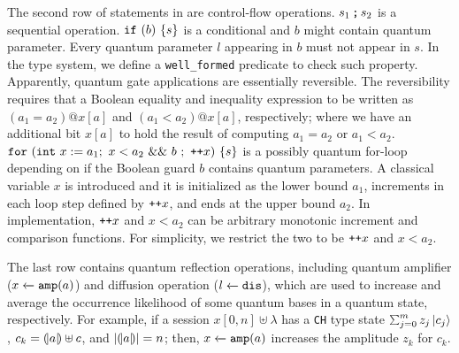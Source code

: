 The second row of statements in  are control-flow operations.
${s_1}\,\texttt{;}\,{s_2}$ is a sequential operation.
$\texttt{if}~{(b)}~{\{s\}}$ is a conditional and $b$ might contain quantum parameter.
Every quantum parameter $l$ appearing in $b$ must not appear in $s$.
In the \qafny type system, we define a \texttt{well\_formed} predicate to check such property.
Apparently, quantum gate applications are essentially reversible. The reversibility requires that a Boolean equality and inequality expression to be written as $(a_1 = a_2) @ x[a]$ and $(a_1 < a_2) @ x[a]$, respectively; where we have an additional bit $x[a]$ to hold the result of computing $a_1=a_2$ or $a_1<a_2$.
$\texttt{for}~{(\texttt{int}~{x}:={a_1};~x<a_2~\&\&~b~;~\texttt{++}x)}~{\{s\}}$ is a possibly quantum for-loop depending on if the Boolean guard $b$ contains quantum parameters.
A classical variable $x$ is introduced and it is initialized as the lower bound $a_1$, increments in each loop step defined by $\texttt{++}x$, and ends at the upper bound $a_2$.
In \qafny implementation, $\texttt{++}x$ and $x<a_2$ can be arbitrary monotonic increment and comparison functions.
For simplicity, we restrict the two to be $\texttt{++}x$ and $x<a_2$.

The last row contains quantum reflection operations, including quantum amplifier (${x} \xleftarrow{} {\texttt{amp}(a)}$) and diffusion operation (${l} \xleftarrow{} {\texttt{dis}}$), which are used to increase and average the occurrence likelihood of some quantum bases in a quantum state, respectively. For example, if a session $x[0,n]\uplus \lambda$ has a \texttt{CH} type state $\sch{m}{z_j}{c_j}$, $c_k=(\!| a |\!)\uplus c$, and $|(\!| a |\!)|=n$; then, ${x} \xleftarrow{} {\texttt{amp}(a)}$ increases the amplitude $z_k$ for $c_k$.


